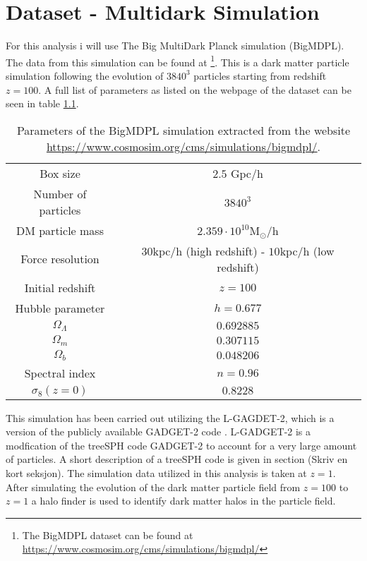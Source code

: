 \chapter{Dataset - Multidark Simulation}
For this analysis i will use The Big MultiDark Planck simulation (BigMDPL)\cite{Multidark_dataset}. The data from this simulation can be found at \footnote{The BigMDPL dataset can be found at \url{https://www.cosmosim.org/cms/simulations/bigmdpl/}}. This is a dark matter particle simulation following the evolution of $3840^3$ particles starting from redshift $z=100$. A full list of parameters as listed on the webpage of the dataset can be seen in table \ref{tab:cosmosimparameters}.
\begin{table}
    \begin{tabular}{| c | c |}
        \hline
        Box size & $2.5$ Gpc/h \\ 
        Number of particles& $3840^3$ \\  
        DM particle mass & $2.359\cdot10^{10} \mathrm{M}_\odot$/h \\
        Force resolution & $30$kpc/h (high redshift) - $10$kpc/h (low redshift)\\
        Initial redshift & $z = 100$\\
        Hubble parameter & $h=0.677$\\
        $\Omega_\Lambda$ & $0.692885$\\
        $\Omega_m$ & $ 0.307115$\\ 
        $ \Omega_b$ & $0.048206$ \\
        Spectral index & $n=0.96$\\
        $\sigma_8(z=0)$ & $0.8228$ \\
        \hline
    \end{tabular}
    \caption{\label{tab:cosmosimparameters}Parameters of the BigMDPL simulation extracted from the website \url{https://www.cosmosim.org/cms/simulations/bigmdpl/}.}
\end{table}
This simulation has been carried out utilizing the L-GAGDET-2, which is a version of the publicly available GADGET-2 code \cite{springel2005}. L-GADGET-2 is a modfication of the treeSPH\cite{treesph} code GADGET-2 to account for a very large amount of particles. A short description of a treeSPH code is given in section (Skriv en kort seksjon). The simulation data utilized in this analysis is taken at $z=1$. After simulating the evolution of the dark matter particle field from $z=100$ to $z=1$ a halo finder is used to identify dark matter halos in the particle field.

